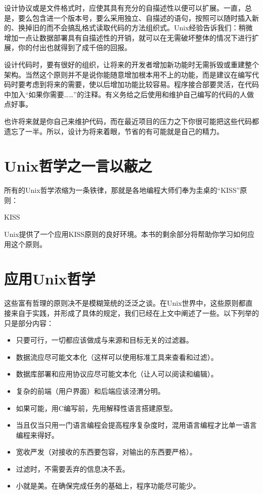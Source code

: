 \documentclass[12pt,oneside]{ctexbook}
\begin{document}
\begin{common-format}
设计协议或是文件格式时，应使其具有充分的自描述性以便可以扩展。一直，总是，要么包含进一个版本号，要么采用独立、自描述的语句，按照可以随时插入新的、换掉旧的而不会搞乱格式读取代码的方法组织式。Unix经验告诉我们：稍微增加一点让数据部署具有自描述性的开销，就可以在无需破坏整体的情况下进行扩展，你的付出也就得到了成千倍的回报。

设计代码时，要有很好的组织，让将来的开发者增加新功能时无需拆毁或重建整个架构。当然这个原则并不是说你能随意增加根本用不上的功能，而是建议在编写代码时要考虑到将来的需要，使以后增加功能比较容易。程序接合部要灵活，在代码中加入“如果你需要……”的注释。有义务给之后使用和维护自己编写的代码的人做点好事。

也许将来就是你自己来维护代码，而在最近项目的压力之下你很可能把这些代码都遗忘了一半。所以，设计为将来着眼，节省的有可能就是自己的精力。

\section{Unix哲学之一言以蔽之}
所有的Unix哲学浓缩为一条铁律，那就是各地编程大师们奉为圭桌的“KISS”原则：
\begin{linefig}{KISS}
\label{fig:KISS}
\end{linefig}

Unix提供了一个应用KISS原则的良好环境。本书的剩余部分将帮助你学习如何应用这个原则。

\section{应用Unix哲学}
这些富有哲理的原则决不是模糊笼统的泛泛之谈。在Unix世界中，这些原则都直接来自于实践，并形成了具体的规定，我们已经在上文中阐述了一些。以下列举的只是部分内容：
\begin{itemize}
\item 只要可行，一切都应该做成与来源和目标无关的过滤器。
\item 数据流应尽可能文本化（这样可以使用标准工具来查看和过滤）。
\item 数据库部署和应用协议应尽可能文本化（让人可以阅读和编辑）。
\item 复杂的前端（用户界面）和后端应该泾渭分明。
\item 如果可能，用C编写前，先用解释性语言搭建原型。
\item 当且仅当只用一门语言编程会提高程序复杂度时，混用语言编程才比单一语言编程来得好。
\item 宽收严发（对接收的东西要包容，对输出的东西要严格）。
\item 过滤时，不需要丢弃的信息决不丢。
\item 小就是美。在确保完成任务的基础上，程序功能尽可能少。
\end{itemize}


\end{common-format}
\end{document}
